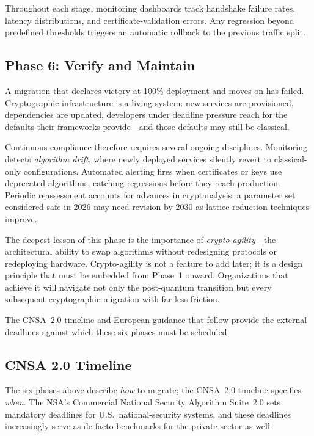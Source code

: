 Throughout each stage, monitoring dashboards track handshake failure rates, latency distributions, and certificate-validation errors.  Any regression beyond predefined thresholds triggers an automatic rollback to the previous traffic split.

\subsection{Phase 6: Verify and Maintain}
\label{subsec:phase-verify}

A migration that declares victory at 100\% deployment and moves on has failed.  Cryptographic infrastructure is a living system: new services are provisioned, dependencies are updated, developers under deadline pressure reach for the defaults their frameworks provide---and those defaults may still be classical.

Continuous compliance therefore requires several ongoing disciplines.  Monitoring detects \emph{algorithm drift}, where newly deployed services silently revert to classical-only configurations.  Automated alerting fires when certificates or keys use deprecated algorithms, catching regressions before they reach production.  Periodic reassessment accounts for advances in cryptanalysis: a parameter set considered safe in 2026 may need revision by 2030 as lattice-reduction techniques improve.

The deepest lesson of this phase is the importance of \emph{crypto-agility}---the architectural ability to swap algorithms without redesigning protocols or redeploying hardware.  Crypto-agility is not a feature to add later; it is a design principle that must be embedded from Phase~1 onward.  Organizations that achieve it will navigate not only the post-quantum transition but every subsequent cryptographic migration with far less friction.

The CNSA~2.0 timeline and European guidance that follow provide the external deadlines against which these six phases must be scheduled.

\subsection{CNSA 2.0 Timeline}
\label{subsec:cnsa20}

The six phases above describe \emph{how} to migrate; the CNSA~2.0 timeline specifies \emph{when}.  The NSA's Commercial National Security Algorithm Suite~2.0 sets mandatory deadlines for U.S.\ national-security systems, and these deadlines increasingly serve as de facto benchmarks for the private sector as well:

